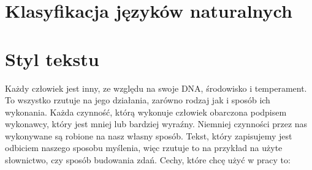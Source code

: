 \documentclass[a4paper,12pt,twoside,openany]{report}
\begin{document}
\section{Klasyfikacja języków naturalnych}
\section{Styl tekstu}
Każdy człowiek jest inny, ze względu na swoje DNA, środowisko i temperament. To wszystko rzutuje na jego działania, zarówno rodzaj jak i sposób ich wykonania. Każda czynność, którą wykonuje człowiek obarczona podpisem wykonawcy, który jest mniej lub bardziej wyraźny. Niemniej czynności przez nas wykonywane są robione na nasz własny sposób. 
Tekst, który zapisujemy jest odbiciem naszego sposobu myślenia, więc rzutuje to na przykład na użyte słownictwo, czy sposób budowania zdań.
Cechy, które chcę użyć w pracy to:
\end{document}
